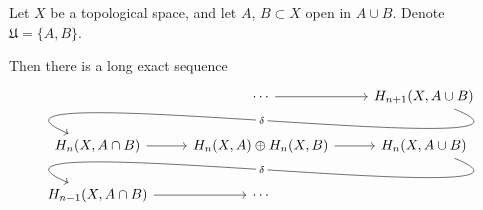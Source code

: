 \documentclass[main.tex]{subfiles}
\begin{document}
\begin{theorem}
  Let $X$ be a topological space, and let $A$, $B \subset X$ open in $A \cup B$. Denote $\mathfrak{U} = \{A, B\}$.

  Then there is a long exact sequence
  \begin{equation*}
    \begin{tikzcd}
      & \cdots
      \arrow[r]
      & H_{n+1}(X, A \cup B)
      \\
      H_{n}(X, A \cap B)
      \arrow[from=urr, out=-22, in=157, looseness=1, overlay, "\delta" description]
      \arrow[r]
      & H_{n}(X, A) \oplus H_{n}(X, B)
      \arrow[r]
      & H_{n}(X, A \cup B)
      \\
      H_{n-1}(X, A \cap B)
      \arrow[r]
      \arrow[from=urr, out=-22, in=157, looseness=1, overlay, "\delta" description]
      & \cdots
    \end{tikzcd}
  \end{equation*}
\end{theorem}
\end{document}
